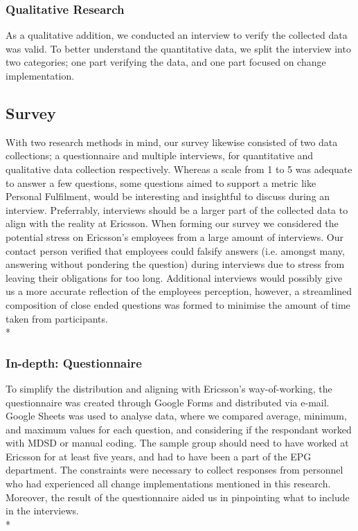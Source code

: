 \documentclass[final_report_innit.tex]{subfiles}
\begin{document}
\subsubsection{Qualitative Research}
As a qualitative addition, we conducted an interview to verify the collected data was valid. To better understand the quantitative data, we split the interview into two categories; one part verifying the data, and one part focused on change implementation.

\subsection{Survey}
With two research methods in mind, our survey likewise consisted of two data collections; a questionnaire and multiple interviews, for quantitative and qualitative data collection respectively. Whereas a scale from 1 to 5 was adequate to answer a few questions, some questions aimed to support a metric like Personal Fulfilment, would be interesting and insightful to discuss during an interview. Preferrably, interviews should be a larger part of the collected data to align with the reality at Ericsson. When forming our survey we considered the potential stress on Ericsson's employees from a large amount of interviews. Our contact person verified that employees could falsify answers (i.e. amongst many, answering without pondering the question) during interviews due to stress from leaving their obligations for too long. Additional interviews would possibly give us a more accurate reflection of the employees perception, however, a streamlined composition of close ended questions was formed to minimise the amount of time taken from participants.
\\*
\subsubsection{In-depth: Questionnaire}
To simplify the distribution and aligning with Ericsson's way-of-working, the questionnaire was created through Google Forms and distributed via e-mail. Google Sheets was used to analyse data, where we compared average, minimum, and maximum values for each question, and considering if the respondant worked with MDSD or manual coding. The sample group should need to have worked at Ericsson for at least five years, and had to have been a part of the EPG department. The constraints were necessary to collect responses from personnel who had experienced all change implementations mentioned in this research. Moreover, the result of the questionnaire aided us in pinpointing what to include in the interviews.
\\*
\end{document}
